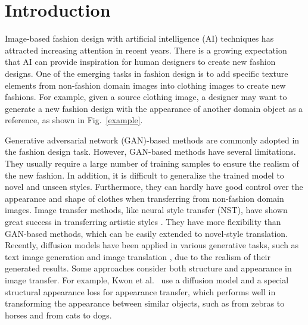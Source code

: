 \section{Introduction} 
Image-based fashion design with artificial intelligence (AI) techniques \cite{ganesan2017fashioning,yan2022toward,sbai2018design,kim2019style,yan2022toward_tmm,zhou2022coutfitgan} has attracted increasing attention in recent years.
There is a growing expectation that AI can provide inspiration for human designers to create new fashion designs. One of the emerging tasks in fashion design is to add specific texture elements from non-fashion domain images into clothing images to create new fashions. For example, given a source clothing image, a designer may want to generate a new fashion design with the appearance of another domain object as a reference, as shown in Fig.~\ref{example}.


Generative adversarial network (GAN)-based methods \cite{yan2022toward,yuan2020garment,cui2018fashiongan} are commonly adopted in the fashion design task. However, GAN-based methods have several limitations. They usually require a large number of training samples to ensure the realism of the new fashion. In addition, it is difficult to generalize the trained model to novel and unseen styles. Furthermore, they can hardly have good control over the appearance and shape of clothes when transferring from non-fashion domain images.
Image transfer methods, like neural style transfer (NST), have shown great success in transferring artistic styles \cite{gatys2016image,huang2017arbitrary,li2016combining,li2016precomputed}. They have more flexibility than GAN-based methods, which can be easily extended to novel-style translation. 
Recently, diffusion models \cite{ho2020denoising,song2020denoising,song2020score} have been applied in various generative tasks, such as text image generation \cite{ramesh2022hierarchical,saharia2022photorealistic} and image translation \cite{gal2022image}, due to the realism of their generated results.
Some approaches \cite{kwon2022diffusion,tumanyan2022splicing} consider both structure and appearance in image transfer. For example, Kwon et al.~\cite{kwon2022diffusion} use a diffusion model and a special structural appearance loss for appearance transfer, which performs well in transforming the appearance between similar objects, such as from zebras to horses and from cats to dogs. 

